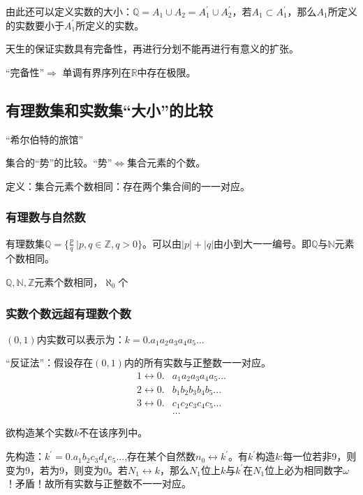 由此还可以定义实数的大小：$\mathbb{Q} = A_1\cup A_2 = A_1^\prime\cup A_2^\prime$，若$A_1\subset A_1^\prime$，那么$A_1$所定义的实数要小于$A_1^\prime$所定义的实数。

天生的保证实数具有完备性，再进行分划不能再进行有意义的扩张。

“完备性”$\Rightarrow$ 单调有界序列在$\mathbb{R}$中存在极限。

\subsection{有理数集和实数集“大小”的比较}
\label{ylsjhshjdxdbj}

“希尔伯特的旅馆”

集合的“势”的比较。“势”$\Leftrightarrow$集合元素的个数。

定义：集合元素个数相同：存在两个集合间的一一对应。

\subsubsection{有理数与自然数}

有理数集$\mathbb{Q} = \{\frac{p}{q}\ |p,q\in \mathbb{Z},q>0\}$。可以由$|p|+|q|$由小到大一一编号。即$\mathbb{Q}$与$\mathbb{N}$元素个数相同。

$\mathbb{Q},\mathbb{N}, \mathbb{Z}$元素个数相同，$\aleph_{0}$个 

\subsubsection{实数个数远超有理数个数}

$(0,1)$内实数可以表示为：$k=0.a_{1}a_{2}a_{3}a_{4}a_{5}...$

“反证法”：假设存在$(0,1)$内的所有实数与正整数一一对应。
\begin{align*}
1\leftrightarrow0.&a_{1}a_{2}a_{3}a_{4}a_{5}...\\
2\leftrightarrow0.&b_{1}b_{2}b_{3}b_{4}b_{5}...\\
3\leftrightarrow0.&c_{1}c_{2}c_{3}c_{4}c_{5}...\\
&...
\end{align*}

欲构造某个实数$k$不在该序列中。

先构造：$k^\prime = 0.a_{1}b_{2}c_{3}d_{4}e_{5}...$,存在某个自然数$n_0\leftrightarrow k^\prime$。有$k^\prime$构造$k$:每一位若非9，则变为9，若为9，则变为0。若$N_1\leftrightarrow k$，那么$N_1$位上$k$与$k^\prime$在$N_1$位上必为相同数字$\omega$！矛盾！故所有实数与正整数不一一对应。

